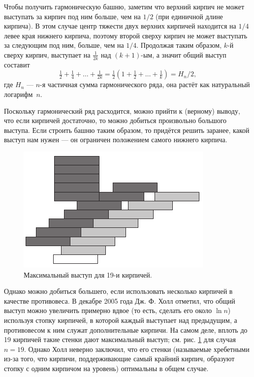 Чтобы получить гармоническую башню, заметим что верхний кирпич не может выступать за  кирпич под ним больше, чем на $1/2$ (при единичной длине кирпича).
В этом случае центр тяжести двух верхних кирпичей находится на $1/4$ левее края нижнего кирпича, поэтому второй сверху кирпич не может выступать за следующим под ним, больше, чем на $1/4$.
Продолжая таким образом, $k$-й сверху кирпич, выступает на $\tfrac1{2k}$ над $(k + 1)$-ым, а значит общий выступ составит 
\[\tfrac12+\tfrac14+\dots+\tfrac1{2k}=\tfrac12(1+\tfrac12+\dots+\tfrac1k)=H_n/2,\]
где $H_n$ --- $n$-я частичная сумма гармонического ряда, она растёт как натуральный логарифм~$n$.

Поскольку гармонический ряд расходится, можно прийти к (верному) выводу, что если кирпичей достаточно, то можно добиться произвольно большого выступа.
Если строить башню таким образом, то придётся решить заранее, какой выступ нам нужен --- он ограничен положением самого нижнего кирпича.

\begin{figure}[htb!]
\centering
\includegraphics[scale=1]{pics/kirpich2}
\caption{Максимальный выступ для 19-и кирпичей.}
\label{pic:kirpich2}
\end{figure}

Однако можно добиться большего, если использовать несколько кирпичей в качестве противовеса.
В декабре 2005 года Дж. Ф. Холл \cite{35} отметил, что общий выступ можно увеличить примерно вдвое (то есть, сделать его около $\ln n$) используя стопку кирпичей, в которой каждый выступает над предыдущим, а противовесом к ним служат дополнительные кирпичи. %
На самом деле, вплоть до 19 кирпичей такие стенки дают максимальный выступ; см. рис. \ref{pic:kirpich2} для случая $n = 19$.
Однако Холл неверно заключил, что его стенки (называемые хребетными из-за того, что кирпичи, поддерживающие самый крайний кирпич, образуют стопку с одним кирпичом на уровень) оптимальны в общем случае.

